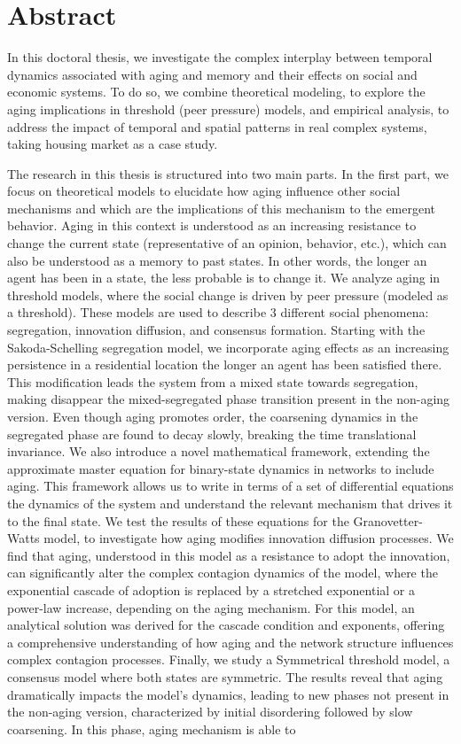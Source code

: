 \pagebreak
\thispagestyle{empty}
\section*{Abstract}

In this doctoral thesis, we investigate the complex interplay between temporal dynamics associated with aging and memory and their effects on social and economic systems. To do so, we combine theoretical modeling, to explore the aging implications in threshold (peer pressure) models, and empirical analysis, to address the impact of temporal and spatial patterns in real complex systems, taking housing market as a case study.

The research in this thesis is structured into two main parts. In the first part, we focus on theoretical models to elucidate how aging influence other social mechanisms and which are the implications of this mechanism to the emergent behavior. Aging in this context is understood as an increasing resistance to change the current state (representative of an opinion, behavior, etc.), which can also be understood as a memory to past states. In other words, the longer an agent has been in a state, the less probable is to change it. We analyze aging in threshold models, where the social change is driven by peer pressure (modeled as a threshold). These models are used to describe 3 different social phenomena: segregation, innovation diffusion, and consensus formation. Starting with the Sakoda-Schelling segregation model, we incorporate aging effects as an increasing persistence in a residential location the longer an agent has been satisfied there. This modification leads the system from a mixed state towards segregation, making disappear the mixed-segregated phase transition present in the non-aging version. Even though aging promotes order, the coarsening dynamics in the segregated phase are found to decay slowly, breaking the time translational invariance. We also introduce a novel mathematical framework, extending the approximate master equation for binary-state dynamics in networks to include aging. This framework allows us to write in terms of a set of differential equations the dynamics of the system and understand the relevant mechanism that drives it to the final state. We test the results of these equations for the Granovetter-Watts model, to investigate how aging modifies innovation diffusion processes. We find that aging, understood in this model as a resistance to adopt the innovation, can significantly alter the complex contagion dynamics of the model, where the exponential cascade of adoption is replaced by a stretched exponential or a power-law increase, depending on the aging mechanism. For this model, an analytical solution was derived for the cascade condition and exponents, offering a comprehensive understanding of how aging and the network structure influences complex contagion processes. Finally, we study a Symmetrical threshold model, a consensus model where both states are symmetric. The results reveal that aging dramatically impacts the model's dynamics, leading to new phases not present in the non-aging version, characterized by initial disordering followed by slow coarsening. In this phase, aging mechanism is able to 